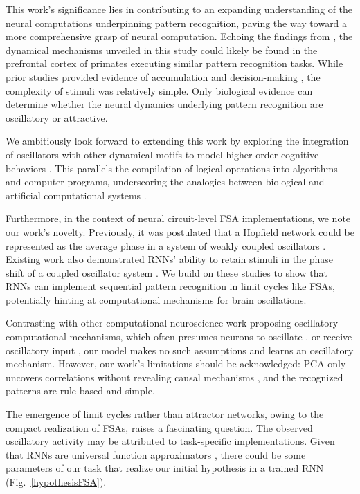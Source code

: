 \documentclass[conference]{IEEEtran}
\begin{document}
This work's significance lies in contributing to an expanding understanding of the neural computations underpinning pattern recognition, paving the way toward a more comprehensive grasp of neural computation. Echoing the findings from \cite{mante2013context}, the dynamical mechanisms unveiled in this study could likely be found in the prefrontal cortex of primates executing similar pattern recognition tasks. While prior studies provided evidence of accumulation and decision-making \cite{chaisangmongkon2017computing}, the complexity of stimuli was relatively simple. Only biological evidence can determine whether the neural dynamics underlying pattern recognition are oscillatory or attractive.

We ambitiously look forward to extending this work by exploring the integration of oscillators with other dynamical motifs to model higher-order cognitive behaviors \cite{driscoll2022flexible}. This parallels the compilation of logical operations into algorithms and computer programs, underscoring the analogies between biological and artificial computational systems \cite{jaeger2021towards}.

Furthermore, in the context of neural circuit-level FSA implementations, we note our work's novelty. Previously, it was postulated that a Hopfield network could be represented as the average phase in a system of weakly coupled oscillators \cite{hoppensteadt1999oscillatory}. Existing work also demonstrated RNNs' ability to retain stimuli in the phase shift of a coupled oscillator system \cite{pals2023trained}. We build on these studies to show that RNNs can implement sequential pattern recognition in limit cycles like FSAs, potentially hinting at computational mechanisms for brain oscillations.

Contrasting with other computational neuroscience work proposing oscillatory computational mechanisms, which often presumes neurons to oscillate \cite{hoppensteadt1999oscillatory}. or receive oscillatory input \cite{pals2023trained}, our model makes no such assumptions and learns an oscillatory mechanism. However, our work's limitations should be acknowledged: PCA only uncovers correlations without revealing causal mechanisms \cite{langdon2022latent}, and the recognized patterns are rule-based and simple.

The emergence of limit cycles rather than attractor networks, owing to the compact realization of FSAs, raises a fascinating question. The observed oscillatory activity may be attributed to task-specific implementations. Given that RNNs are universal function approximators \cite{b28}, there could be some parameters of our task that realize our initial hypothesis in a trained RNN (Fig.~\ref{hypothesisFSA}).
\end{document}
